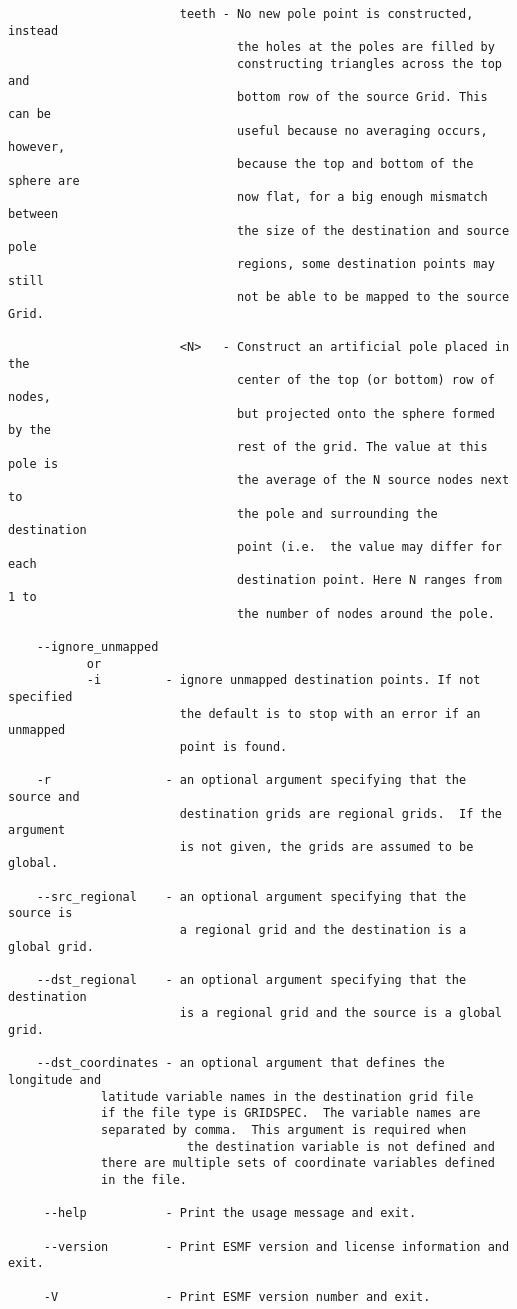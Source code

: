 \begin{verbatim}
                        teeth - No new pole point is constructed, instead
                                the holes at the poles are filled by
                                constructing triangles across the top and
                                bottom row of the source Grid. This can be
                                useful because no averaging occurs, however,
                                because the top and bottom of the sphere are
                                now flat, for a big enough mismatch between
                                the size of the destination and source pole
                                regions, some destination points may still
                                not be able to be mapped to the source Grid.

                        <N>   - Construct an artificial pole placed in the
                                center of the top (or bottom) row of nodes,
                                but projected onto the sphere formed by the
                                rest of the grid. The value at this pole is
                                the average of the N source nodes next to
                                the pole and surrounding the destination
                                point (i.e.  the value may differ for each
                                destination point. Here N ranges from 1 to
                                the number of nodes around the pole.

    --ignore_unmapped
           or
           -i         - ignore unmapped destination points. If not specified
                        the default is to stop with an error if an unmapped
                        point is found.

    -r                - an optional argument specifying that the source and
                        destination grids are regional grids.  If the argument
                        is not given, the grids are assumed to be global.

    --src_regional    - an optional argument specifying that the source is
                        a regional grid and the destination is a global grid.

    --dst_regional    - an optional argument specifying that the destination
                        is a regional grid and the source is a global grid.

    --dst_coordinates - an optional argument that defines the longitude and
			 latitude variable names in the destination grid file
			 if the file type is GRIDSPEC.  The variable names are
			 separated by comma.  This argument is required when
                         the destination variable is not defined and
			 there are multiple sets of coordinate variables defined
			 in the file.  

     --help           - Print the usage message and exit.

     --version        - Print ESMF version and license information and exit.

     -V               - Print ESMF version number and exit.
\end{verbatim}


